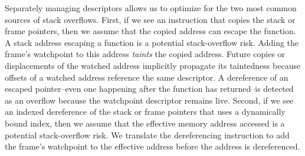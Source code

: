 \documentclass[letterpaper,twocolumn,10pt]{article}
\begin{document}

Separately managing descriptors allows us to optimize for the two most common sources of stack overflows. First, if we see an instruction that copies the stack or frame pointers, then we assume that the copied address can escape the function. A stack address escaping a function is a potential stack-overflow risk. Adding the frame's watchpoint to this address \emph{taints} the copied address. Future copies or displacements of the watched address implicitly propagate its taintedness because offsets of a watched address reference the same descriptor. A dereference of an escaped pointer--even one happening after the function has returned--is detected as an overflow because the watchpoint descriptor remains live. Second, if we see an indexed dereference of the stack or frame pointers that uses a dynamically bound index, then we assume that the effective memory address accessed is a potential stack-overflow risk. We translate the dereferencing instruction to add the frame's watchpoint to the effective address before the address is dereferenced.



\end{document}
